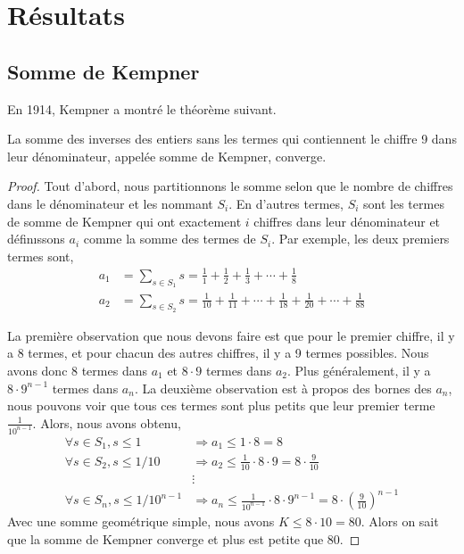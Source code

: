 \section{R\'esultats}
\subsection{Somme de Kempner}
En 1914, Kempner a montr\'e le th\'eor\`eme suivant.\cite{kempner}
\begin{thm}
	La somme des inverses des entiers sans les termes qui contiennent le chiffre 9 dans
	leur d\'enominateur, appel\'ee somme de Kempner, converge.
\end{thm}
\begin{proof}
	Tout d'abord, nous partitionnons le somme selon que le nombre de chiffres
	dans le d\'enominateur et les nommant $S_{i}$. En d'autres termes, $S_{i}$
	sont les termes de somme de Kempner qui ont exactement $i$ chiffres dans
	leur d\'enominateur et d\'efinıssons $a_{i}$ comme la somme des termes de
	$S_{i}$.  Par exemple, les deux premiers termes sont,
	\begin{equation*}
		\begin{split}
			a_1 &= \sum_{s\in S_{1}} s = \frac{1}{1} + \frac{1}{2}
			+\frac{1}{3} + \cdots +\frac{1}{8} \\ a_2 &= \sum_{s\in S_{2}}
			s = \frac{1}{10} + \frac{1}{11} + \cdots + \frac{1}{18}
			+\frac{1}{20} + \cdots + \frac{1}{88}
		\end{split}
	\end{equation*}

	La premi\`ere observation que nous devons faire est que pour le premier
	chiffre, il y a 8 termes, et pour chacun des autres chiffres, il y a 9
	termes possibles. Nous avons donc 8 termes dans $a_{1}$ et $8\cdot9$ termes
	dans $a_{2}$. Plus g\'en\'eralement, il y a $8\cdot 9^{n-1}$ termes dans
	$a_{n}$. La deuxi\`eme observation est \`a propos des bornes des $a_{n}$,
	nous pouvons voir que tous ces termes sont plus petits que leur premier
	terme $\frac{1}{10^{n-1}}$. Alors, nous avons obtenu,
	\begin{equation*}
		\begin{split}
			\forall s\in S_{1}, s \le 1 &\Rightarrow a_{1} \le 1 \cdot 8 = 8\\
			\forall s\in S_{2}, s \le 1/10 &\Rightarrow a_{2} \le \frac{1}{10}
			\cdot 8 \cdot 9 = 8\cdot \frac{9}{10} \\
							  &  \vdots \\
			\forall s\in S_{n}, s \le 1/10^{n-1} &\Rightarrow a_{n} \le
			\frac{1}{10^{n-1}} \cdot 8 \cdot 9^{n-1} = 8\cdot \left(
			\frac{9}{10}\right)^{n-1}
		\end{split}
	\end{equation*}
	Avec une somme geom\'etrique simple, nous avons $K\le8\cdot10=80$. Alors on
	sait que la somme de Kempner converge et plus est petite que 80.
\end{proof}

